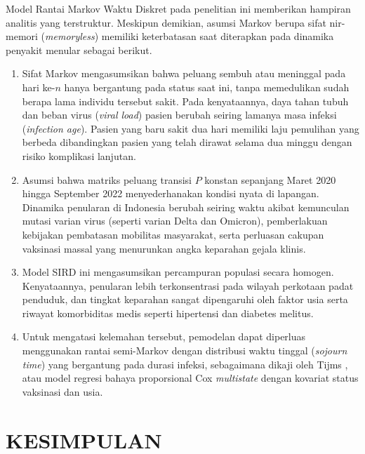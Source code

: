 \documentclass[12pt,a4paper]{article}
\numberwithin{equation}{section}
\begin{document}
Model Rantai Markov Waktu Diskret pada penelitian ini memberikan hampiran analitis yang terstruktur. Meskipun demikian, asumsi Markov berupa sifat nir-memori (\textit{memoryless}) memiliki keterbatasan saat diterapkan pada dinamika penyakit menular sebagai berikut.
\begin{enumerate}
  \item Sifat Markov mengasumsikan bahwa peluang sembuh atau meninggal pada hari ke-$n$ hanya bergantung pada status saat ini, tanpa memedulikan sudah berapa lama individu tersebut sakit. Pada kenyataannya, daya tahan tubuh dan beban virus (\textit{viral load}) pasien berubah seiring lamanya masa infeksi (\textit{infection age}). Pasien yang baru sakit dua hari memiliki laju pemulihan yang berbeda dibandingkan pasien yang telah dirawat selama dua minggu dengan risiko komplikasi lanjutan.
  \item Asumsi bahwa matriks peluang transisi $P$ konstan sepanjang Maret 2020 hingga September 2022 menyederhanakan kondisi nyata di lapangan. Dinamika penularan di Indonesia berubah seiring waktu akibat kemunculan mutasi varian virus (seperti varian Delta dan Omicron), pemberlakuan kebijakan pembatasan mobilitas masyarakat, serta perluasan cakupan vaksinasi massal yang menurunkan angka keparahan gejala klinis.
  \item Model SIRD ini mengasumsikan percampuran populasi secara homogen. Kenyataannya, penularan lebih terkonsentrasi pada wilayah perkotaan padat penduduk, dan tingkat keparahan sangat dipengaruhi oleh faktor usia serta riwayat komorbiditas medis seperti hipertensi dan diabetes melitus.
  \item Untuk mengatasi kelemahan tersebut, pemodelan dapat diperluas menggunakan rantai semi-Markov dengan distribusi waktu tinggal (\textit{sojourn time}) yang bergantung pada durasi infeksi, sebagaimana dikaji oleh Tijms \cite{tijms2003}, atau model regresi bahaya proporsional Cox \textit{multistate} dengan kovariat status vaksinasi dan usia.
\end{enumerate}

\clearpage
\section{KESIMPULAN}
\thispagestyle{plain}
\end{document}
